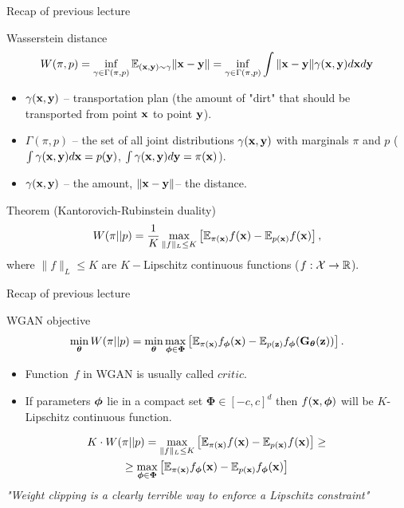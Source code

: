 \begin{frame}{Recap of previous lecture}
	\begin{block}{Wasserstein distance}
		\vspace{-0.5cm}
		\[
		W(\pi, p) = \inf_{\gamma \in \Gamma(\pi, p)} \mathbb{E}_{(\mathbf{x}, \mathbf{y}) \sim \gamma} \| \mathbf{x} - \mathbf{y} \| =  \inf_{\gamma \in \Gamma(\pi, p)} \int \| \mathbf{x} - \mathbf{y} \| \gamma (\mathbf{x}, \mathbf{y}) d \mathbf{x} d \mathbf{y}
		\]
		\vspace{-0.5cm}
		\begin{itemize}
			\item $\gamma(\mathbf{x}, \mathbf{y})$ -- transportation plan (the amount of "dirt" that should be transported from point $\mathbf{x}$ to point $\mathbf{y}$).
			\item $\Gamma(\pi, p)$ -- the set of all joint distributions $\gamma (\mathbf{x}, \mathbf{y})$ with marginals $\pi$ and $p$ ($\int \gamma(\mathbf{x}, \mathbf{y}) d \mathbf{x} = p(\mathbf{y})$, $\int \gamma(\mathbf{x}, \mathbf{y}) d \mathbf{y} = \pi(\mathbf{x})$).
			\item $\gamma(\mathbf{x}, \mathbf{y})$ -- the amount, $\|\mathbf{x} - \mathbf{y} \|$-- the distance.
		\end{itemize}
	\end{block}
	\begin{block}{Theorem (Kantorovich-Rubinstein duality)}
		\vspace{-0.2cm}
		\[
		W(\pi || p) = \frac{1}{K} \max_{\| f \|_L \leq K} \left[ \mathbb{E}_{\pi(\mathbf{x})} f(\mathbf{x})  - \mathbb{E}_{p(\mathbf{x})} f(\mathbf{x})\right],
		\]
		where $\| f \|_L \leq K$ are $K-$Lipschitz continuous functions ($f: \mathcal{X} \rightarrow \mathbb{R}$).
	\end{block}
\end{frame}
\begin{frame}{Recap of previous lecture}
	\begin{block}{WGAN objective}
		\vspace{-0.3cm}
		\[
		\min_{\boldsymbol{\theta}} W(\pi || p) = \min_{\boldsymbol{\theta}} \max_{\boldsymbol{\phi} \in \boldsymbol{\Phi}} \left[ \mathbb{E}_{\pi(\mathbf{x})} f_{\boldsymbol{\phi}}(\mathbf{x})  - \mathbb{E}_{p(\mathbf{z})} f_{\boldsymbol{\phi}}(\mathbf{G}_{\boldsymbol{\theta}}(\mathbf{z}))\right].
		\]
		\vspace{-0.3cm}
	\end{block}
	\begin{itemize}
		\item Function~$f$ in WGAN is usually called $\textit{critic}$.
		\item If parameters $\boldsymbol{\phi}$ lie in a compact set $\boldsymbol{\Phi} \in [-c, c]^d$ then $f(\mathbf{x}, \boldsymbol{\phi})$ will be $K$-Lipschitz continuous function. 
	\end{itemize}
	\begin{multline*}
		K \cdot W(\pi || p) = \max_{\| f \|_L \leq K} \left[ \mathbb{E}_{\pi(\mathbf{x})} f(\mathbf{x})  - \mathbb{E}_{p(\mathbf{x})} f(\mathbf{x})\right] \geq \\  \geq \max_{\boldsymbol{\phi} \in \boldsymbol{\Phi}} \left[ \mathbb{E}_{\pi(\mathbf{x})} f_{\boldsymbol{\phi}}(\mathbf{x})  - \mathbb{E}_{p(\mathbf{x})} f_{\boldsymbol{\phi}}(\mathbf{x})\right]
	\end{multline*}
	\textit{"Weight clipping is a clearly terrible way to enforce a Lipschitz constraint"}
\end{frame}
